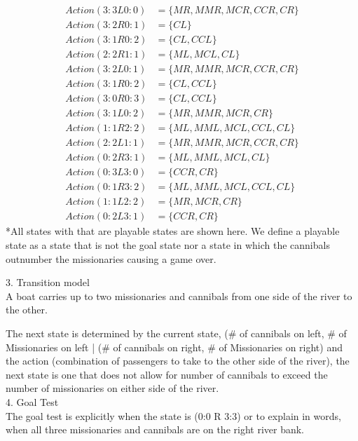 \documentclass{article}
\begin{document}
\begin{align*}
	Action(3:3 L 0:0) &= \{ MR, MMR, MCR, CCR, CR \} \\
	Action(3:2 R 0:1) &=  \{ CL \}\\
	Action(3:1 R 0:2) &= \{ CL, CCL \}\\
	Action(2:2 R 1:1) &= \{ ML, MCL, CL\}\\
	Action(3:2 L 0:1) &= \{ MR,MMR,MCR,CCR,CR\}\\
	Action(3:1 R 0:2) &= \{ CL, CCL\}\\
	Action(3:0 R 0:3) &= \{ CL, CCL\} \\
	Action(3:1 L 0:2) &= \{  MR, MMR, MCR,CR\}\\
	Action(1:1 R 2:2) &= \{ ML, MML, MCL, CCL, CL\} \\
	Action(2:2 L 1:1) &= \{ MR, MMR, MCR, CCR, CR\} \\
	Action(0:2 R 3:1) &= \{ ML, MML, MCL, CL\} \\
	Action(0:3 L 3:0) &= \{ CCR, CR\} \\
	Action(0:1 R 3:2) &= \{ ML, MML, MCL, CCL, CL\} \\
	Action(1:1 L 2:2) &= \{ MR, MCR, CR\} \\
	Action(0:2 L 3:1) &= \{ CCR, CR\}
\end{align*}	
	*All states with that are playable states are shown here. We define a playable state as a state that is not the goal state nor a state in which the cannibals outnumber the missionaries causing a game over.


3. Transition model\\
\newline
A boat carries up to two missionaries and cannibals from one side of the river to the other.

The next state is determined by the current state, (\# of cannibals on left, \# of Missionaries on left | (\# of cannibals on right, \# of Missionaries on right) and the action (combination of passengers to take to the other side of the river), the next state is one that does not allow for number of cannibals to exceed the number of missionaries on either side of the river.\\

4. Goal Test\\
\newline
 The goal test is explicitly when the state is (0:0 R 3:3) or to explain in words, when all three missionaries and cannibals are on the right river bank.\\
\end{document}
